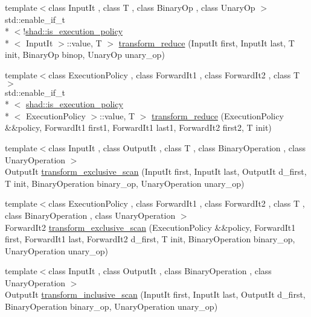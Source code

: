 \begin{DoxyCompactItemize}
{\footnotesize template$<$class Input\-It , class T , class Binary\-Op , class Unary\-Op $>$ }\\std\-::enable\-\_\-if\-\_\-t\\*
$<$!\hyperlink{structshad_1_1is__execution__policy}{shad\-::is\-\_\-execution\-\_\-policy}\\*
$<$ Input\-It $>$\-::value, T $>$ \hyperlink{namespaceshad_a68e4deac86c665ff2d3d3550c7042331}{transform\-\_\-reduce} (Input\-It first, Input\-It last, T init, Binary\-Op binop, Unary\-Op unary\-\_\-op)
\item 
{\footnotesize template$<$class Execution\-Policy , class Forward\-It1 , class Forward\-It2 , class T $>$ }\\std\-::enable\-\_\-if\-\_\-t\\*
$<$ \hyperlink{structshad_1_1is__execution__policy}{shad\-::is\-\_\-execution\-\_\-policy}\\*
$<$ Execution\-Policy $>$\-::value, T $>$ \hyperlink{namespaceshad_a1de0e51e5616aabd05a68412086358ae}{transform\-\_\-reduce} (Execution\-Policy \&\&policy, Forward\-It1 first1, Forward\-It1 last1, Forward\-It2 first2, T init)
\item 
{\footnotesize template$<$class Input\-It , class Output\-It , class T , class Binary\-Operation , class Unary\-Operation $>$ }\\Output\-It \hyperlink{namespaceshad_a58f5206d294f2437782ed7f197eb1d0d}{transform\-\_\-exclusive\-\_\-scan} (Input\-It first, Input\-It last, Output\-It d\-\_\-first, T init, Binary\-Operation binary\-\_\-op, Unary\-Operation unary\-\_\-op)
\item 
{\footnotesize template$<$class Execution\-Policy , class Forward\-It1 , class Forward\-It2 , class T , class Binary\-Operation , class Unary\-Operation $>$ }\\Forward\-It2 \hyperlink{namespaceshad_a1ad8ba4e807e353d19cbe7f118914856}{transform\-\_\-exclusive\-\_\-scan} (Execution\-Policy \&\&policy, Forward\-It1 first, Forward\-It1 last, Forward\-It2 d\-\_\-first, T init, Binary\-Operation binary\-\_\-op, Unary\-Operation unary\-\_\-op)
\item 
{\footnotesize template$<$class Input\-It , class Output\-It , class Binary\-Operation , class Unary\-Operation $>$ }\\Output\-It \hyperlink{namespaceshad_abae2714cc427e081f0f399648d5cfdef}{transform\-\_\-inclusive\-\_\-scan} (Input\-It first, Input\-It last, Output\-It d\-\_\-first, Binary\-Operation binary\-\_\-op, Unary\-Operation unary\-\_\-op)
\item 

\end{DoxyCompactItemize}
